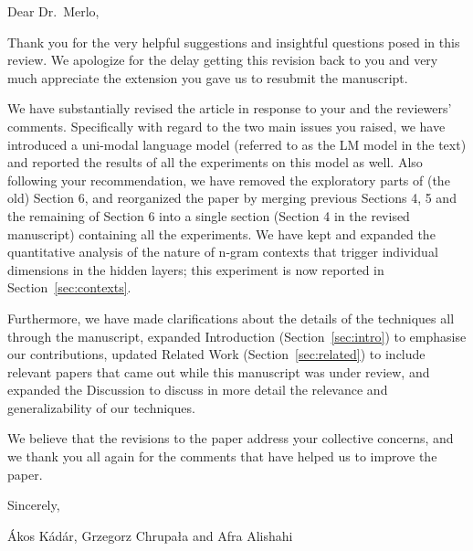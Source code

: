 \newpage
{}

\noindent
Dear Dr.~Merlo,
\newline

Thank you for the very helpful suggestions and insightful questions
posed in this review.  We apologize for the delay getting this
revision back to you and very much appreciate the extension you 
gave us to resubmit the manuscript.

We have substantially revised the article in response to your and the reviewers' 
comments. Specifically with regard to the two main issues you raised, we have 
introduced a uni-modal language model (referred to as the {\sc LM} model in the text) 
and reported the results of all the experiments on this model as well. Also following 
your recommendation, we have removed the exploratory parts of (the old) Section 6, 
and reorganized the paper by merging previous Sections 4, 5 and the remaining of 
Section 6 into a single section (Section 4 in the revised manuscript) containing all the 
experiments. We have kept and expanded the quantitative analysis of the nature of 
n-gram contexts that trigger individual dimensions in the hidden layers; this experiment is now reported in Section~\ref{sec:contexts}.

Furthermore, we have made clarifications about the details of the techniques all 
through the manuscript, expanded Introduction (Section~\ref{sec:intro}) to 
emphasise our contributions, updated Related Work (Section~\ref{sec:related}) 
to include relevant papers that came out while this manuscript was under review, and expanded the Discussion to discuss in more detail the relevance and generalizability of our techniques. 

We believe that the revisions to the paper address your collective
concerns, and we thank you all again for the comments that have helped
us to improve the paper.
\newline

\noindent
Sincerely,
\newline

\noindent
Ákos Kádár, Grzegorz Chrupała and Afra Alishahi
\newline


